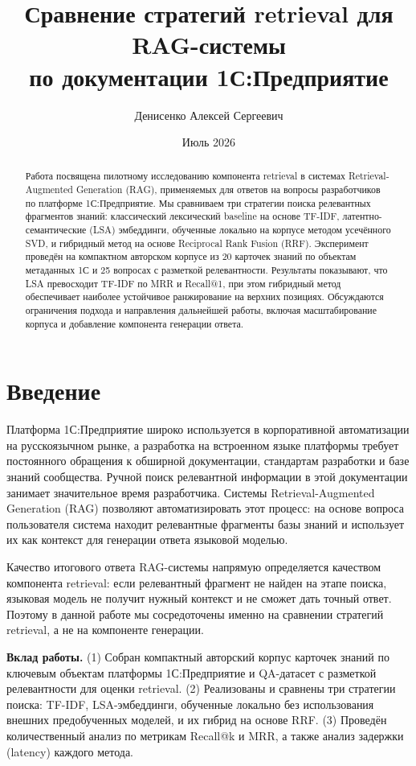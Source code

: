 \documentclass[11pt]{article}
\title{Сравнение стратегий retrieval для RAG-системы \\ по документации 1С:Предприятие}
\author{Денисенко Алексей Сергеевич }
\date{Июль 2026}
\begin{document}
\maketitle

\begin{abstract}
Работа посвящена пилотному исследованию компонента retrieval в системах
Retrieval-Augmented Generation (RAG), применяемых для ответов на вопросы
разработчиков по платформе 1С:Предприятие. Мы сравниваем три стратегии
поиска релевантных фрагментов знаний: классический лексический baseline
на основе TF-IDF, латентно-семантические (LSA) эмбеддинги, обученные
локально на корпусе методом усечённого SVD, и гибридный метод на основе
Reciprocal Rank Fusion (RRF). Эксперимент проведён на компактном
авторском корпусе из 20 карточек знаний по объектам метаданных 1С и
25 вопросах с разметкой релевантности. Результаты показывают, что LSA
превосходит TF-IDF по MRR и Recall@1, при этом гибридный метод обеспечивает
наиболее устойчивое ранжирование на верхних позициях. Обсуждаются
ограничения подхода и направления дальнейшей работы, включая масштабирование
корпуса и добавление компонента генерации ответа.
\end{abstract}

\section{Введение}

Платформа 1С:Предприятие широко используется в корпоративной автоматизации
на русскоязычном рынке, а разработка на встроенном языке платформы требует
постоянного обращения к обширной документации, стандартам разработки и базе
знаний сообщества. Ручной поиск релевантной информации в этой документации
занимает значительное время разработчика. Системы Retrieval-Augmented
Generation (RAG) позволяют автоматизировать этот процесс: на основе вопроса
пользователя система находит релевантные фрагменты базы знаний и использует
их как контекст для генерации ответа языковой моделью.

Качество итогового ответа RAG-системы напрямую определяется качеством
компонента retrieval: если релевантный фрагмент не найден на этапе поиска,
языковая модель не получит нужный контекст и не сможет дать точный ответ.
Поэтому в данной работе мы сосредоточены именно на сравнении стратегий
retrieval, а не на компоненте генерации.

\textbf{Вклад работы.} (1) Собран компактный авторский корпус карточек
знаний по ключевым объектам платформы 1С:Предприятие и QA-датасет с
разметкой релевантности для оценки retrieval. (2) Реализованы и сравнены
три стратегии поиска: TF-IDF, LSA-эмбеддинги, обученные локально без
использования внешних предобученных моделей, и их гибрид на основе RRF.
(3) Проведён количественный анализ по метрикам Recall@k и MRR, а также
анализ задержки (latency) каждого метода.
\end{document}
